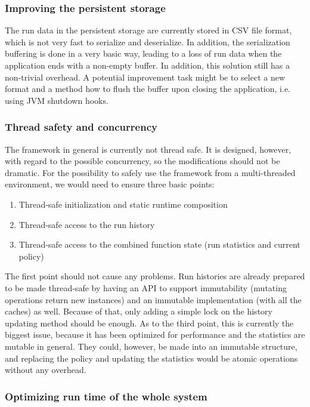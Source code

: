 \subsubsection{Improving the persistent storage}

The run data in the persistent storage are currently stored in CSV file format, which is not very fast to serialize and deserialize. In addition, the serialization buffering is done in a very basic way, leading to a loss of run data when the application ends with a non-empty buffer. In addition, this solution still has a non-trivial overhead. A potential improvement task might be to select a new format and a method how to flush the buffer upon closing the application, i.e. using JVM shutdown hooks.

\subsubsection{Thread safety and concurrency}

The framework in general is currently not thread safe. It is designed, however, with regard to the possible concurrency, so the modifications should not be dramatic. For the possibility to safely use the framework from a multi-threaded environment, we would need to ensure three basic points:

\begin{enumerate}
	\item Thread-safe initialization and static runtime composition
	\item Thread-safe access to the run history
	\item Thread-safe access to the combined function state (run statistics and current policy)
\end{enumerate}

The first point should not cause any problems. Run histories are already prepared to be made thread-safe by having an API to support immutability (mutating operations return new instances) and an immutable implementation (with all the caches) as well. Because of that, only adding a simple lock on the history updating method should be enough. As to the third point, this is currently the biggest issue, because it has been optimized for performance and the statistics are mutable in general. They could, however, be made into an immutable structure, and replacing the policy and updating the statistics would be atomic operations without any overhead.

\subsubsection{Optimizing run time of the whole system}

